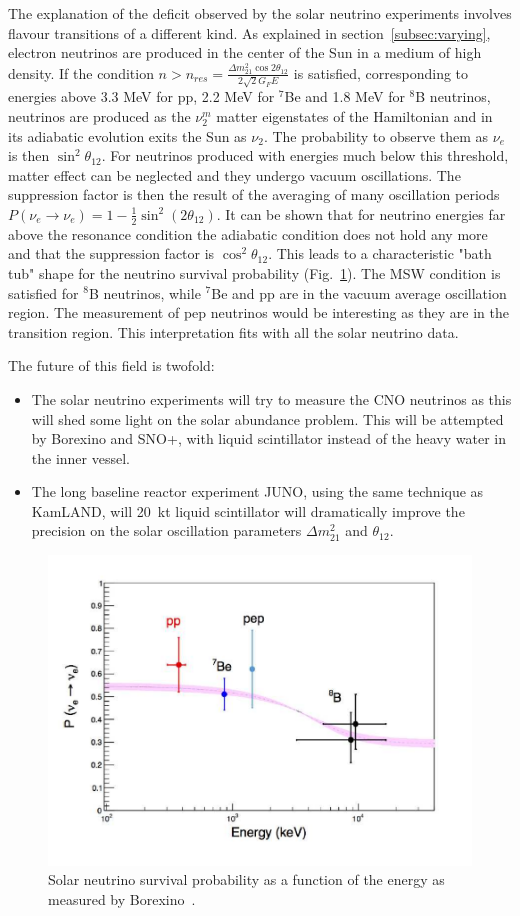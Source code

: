 The explanation of the deficit observed by the solar neutrino experiments involves flavour transitions of a different kind. As explained in section~\ref{subsec:varying}, electron neutrinos are produced in the center of the Sun in a medium of high density. If the condition $n > n_{res}= \frac{\Delta m^2_{21} \cos 2 \theta_{12}}{ 2 \sqrt{2}G_F E}$ is satisfied, corresponding to energies above 3.3 MeV for pp, 2.2 MeV for $^7$Be and 1.8 MeV for $^8$B neutrinos, neutrinos are produced as the $ \nu^m_2$ matter eigenstates of the Hamiltonian and in its adiabatic evolution exits the Sun as $\nu_2$. The probability to observe them as $\nu_e$ is then $\sin^2 \theta_{12}$. For neutrinos produced with energies much below this threshold, matter effect can be neglected and they undergo vacuum oscillations. The suppression factor is then the result of the averaging of many oscillation periods    
$ P({\nu}_e \rightarrow {\nu}_e ) = 1 - \frac{1}{2} \sin^2 (2 \theta_{12})$. 
It can be shown that for neutrino energies far above the resonance condition the adiabatic condition does not hold any more and that the suppression factor is $\cos^2 \theta_{12} $. This leads to a characteristic "bath tub" shape for the neutrino survival probability (Fig.~\ref{fig:sol-bor}). The MSW condition is satisfied for $^8$B neutrinos, while  
$^7$Be and pp are in the vacuum average oscillation region. The measurement of pep neutrinos would be interesting as they are in the transition region.
This interpretation fits with all the solar neutrino data. 

The future of this field is twofold:
\begin{itemize}
\item The solar neutrino experiments will try to measure the CNO neutrinos as this will shed some light on the solar abundance problem. This will be attempted by Borexino and SNO+, with liquid scintillator instead of the heavy water in the inner vessel.
\item The long baseline reactor experiment JUNO, using the same technique as KamLAND, will 20~kt liquid scintillator will dramatically improve the precision on the solar oscillation parameters  $\Delta m^2_{21}$ and $\theta_{12}$.
\end{itemize}


\begin{figure}[htbp]
\centering
\includegraphics[width=0.6\linewidth]{figures/derbin_fig5c.pdf}
  \caption{
  Solar neutrino survival probability as a function of the energy as measured by Borexino~\cite{derbin2016}.
}
 \label{fig:sol-bor}
 \end{figure}
